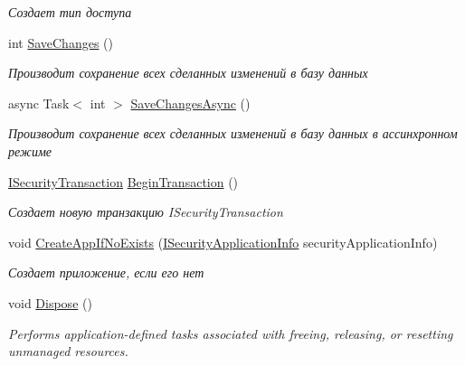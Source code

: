 \begin{DoxyCompactItemize}
\begin{DoxyCompactList}\small\item\em Создает тип доступа \end{DoxyCompactList}\item 
int \hyperlink{class_security_1_1_entity_framework_1_1_security_factory_a638532b6e8fd71f5f82170abee4ae433}{Save\+Changes} ()
\begin{DoxyCompactList}\small\item\em Производит сохранение всех сделанных изменений в базу данных \end{DoxyCompactList}\item 
async Task$<$ int $>$ \hyperlink{class_security_1_1_entity_framework_1_1_security_factory_a92e4049cb25c1cd3b9ca43b1aec096ad}{Save\+Changes\+Async} ()
\begin{DoxyCompactList}\small\item\em Производит сохранение всех сделанных изменений в базу данных в ассинхронном режиме \end{DoxyCompactList}\item 
\hyperlink{interface_security_1_1_interfaces_1_1_i_security_transaction}{I\+Security\+Transaction} \hyperlink{class_security_1_1_entity_framework_1_1_security_factory_a5405f1e0c85e32a61afab9026170a114}{Begin\+Transaction} ()
\begin{DoxyCompactList}\small\item\em Создает новую транзакцию I\+Security\+Transaction \end{DoxyCompactList}\item 
void \hyperlink{class_security_1_1_entity_framework_1_1_security_factory_af1122c2628a47f986b80bdb99fdfb39c}{Create\+App\+If\+No\+Exists} (\hyperlink{interface_security_1_1_interfaces_1_1_i_security_application_info}{I\+Security\+Application\+Info} security\+Application\+Info)
\begin{DoxyCompactList}\small\item\em Создает приложение, если его нет \end{DoxyCompactList}\item 
void \hyperlink{class_security_1_1_entity_framework_1_1_security_factory_a2c2ceec2782dd947137009027aace70b}{Dispose} ()
\begin{DoxyCompactList}\small\item\em Performs application-\/defined tasks associated with freeing, releasing, or resetting unmanaged resources. \end{DoxyCompactList}\end{DoxyCompactItemize}
